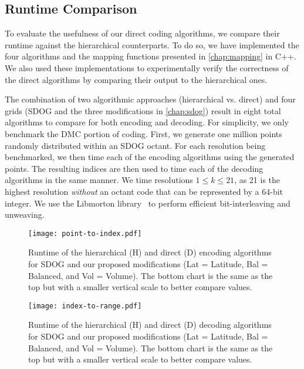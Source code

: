 \subsection{Runtime Comparison}
To evaluate the usefulness of our direct coding algorithms, we compare their runtime against the hierarchical counterparts.
To do so, we have implemented the four algorithms and the mapping functions presented in \cref{chap:mapping} in C++.
We also used these implementations to experimentally verify the correctness of the direct algorithms by comparing their output to the hierarchical ones.


The combination of two algorithmic approaches (hierarchical vs. direct) and four grids (SDOG and the three modifications in \cref{chap:sdog}) result in eight total algorithms to compare for both encoding and decoding.
For simplicity, we only benchmark the DMC portion of coding.
First, we generate one million points randomly distributed within an SDOG octant.
For each resolution being benchmarked, we then time each of the encoding algorithms using the generated points.
The resulting indices are then used to time each of the decoding algorithms in the same manner.
We time resolutions $1 \le k \le 21$, as 21 is the highest resolution \textit{without} an octant code that can be represented by a 64-bit integer.
We use the Libmorton library~\cite{libmorton18} to perform efficient bit-interleaving and unweaving.


\begin{figure}[htp!]
	\centering
	\texttt{[image: point-to-index.pdf]}
	\caption[Runtime comparison of SDOG point encoding algorithms]{
		Runtime of the hierarchical (H) and direct (D) encoding algorithms for SDOG and our proposed modifications (Lat = Latitude, Bal = Balanced, and Vol = Volume).
		The bottom chart is the same as the top but with a smaller vertical scale to better compare values.
	}
	\label{fig:point-to-index}
\end{figure}


\begin{figure}[htp!]
	\centering
	\texttt{[image: index-to-range.pdf]}
	\caption[Runtime comparison of SDOG decoding algorithms]{
		Runtime of the hierarchical (H) and direct (D) decoding algorithms for SDOG and our proposed modifications (Lat = Latitude, Bal = Balanced, and Vol = Volume).
		The bottom chart is the same as the top but with a smaller vertical scale to better compare values.
	}
	\label{fig:index-to-range}
\end{figure}


